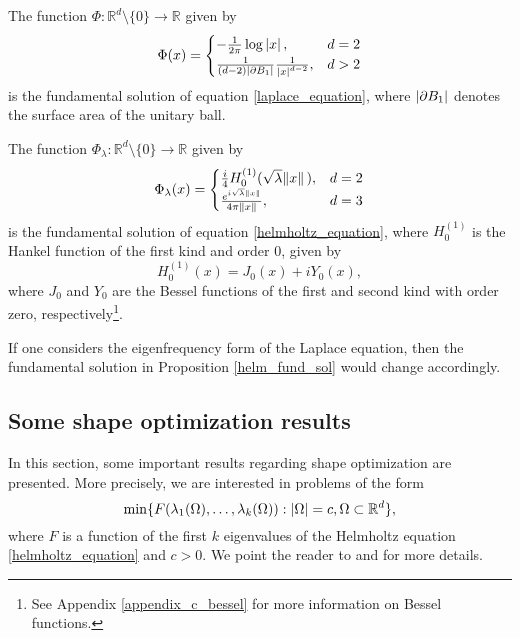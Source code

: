 \begin{proposition}
    The function \(\Phi: \mathbb{R}^d \setminus \{0\} \rightarrow \mathbb{R}\) given by
    \[
    \Phi(x) = \begin{cases}
        -\frac{1}{2 \pi} \log \abs*{x}, & d=2\\
        \frac{1}{(d-2)\abs{\partial B_1}}\frac{1}{\abs*{x}^{d-2}}, & d > 2
    \end{cases}    
    \]
    is the fundamental solution of equation \eqref{laplace_equation}, where \(\abs{\partial B_1}\) denotes the surface area of the unitary ball.
\end{proposition}
\begin{proposition}\label{helm_fund_sol}
    The function \(\Phi_\lambda: \mathbb{R}^d \setminus \{0\} \rightarrow \mathbb{R}\) given by
    \[
    \Phi_\lambda(x) = \begin{cases}
        \frac{i}{4} H_0^{(1)}(\sqrt{\lambda} \norm*{x}), & d=2\\
        \frac{e^{i \sqrt{\lambda} \norm*{x}}}{4 \pi \norm*{x}}, & d = 3
    \end{cases}    
    \]
    is the fundamental solution of equation \eqref{helmholtz_equation}, where \(H_0^{(1)}\) is the Hankel function of the first kind and order 0, given by
    \[
        H_0^{(1)}(x) = J_0(x) + i Y_0(x),
    \]
    where \(J_0\) and \(Y_0\) are the Bessel functions of the first and second kind with order zero, respectively\footnote{See Appendix \ref{appendix_c_bessel} for more information on Bessel functions.}.
\end{proposition}

If one considers the eigenfrequency form of the Laplace equation, then the fundamental solution in Proposition \ref{helm_fund_sol} would change accordingly.

\subsection{Some shape optimization results}

In this section, some important results regarding shape optimization are presented. More precisely, we are interested in problems of the form
\begin{equation}\label{shape_prob}
    \min\{F(\lambda_1(\Omega),\dots, \lambda_k(\Omega)): \abs{\Omega} = c, \Omega \subset \mathbb{R}^d\},
\end{equation}
where \(F\) is a function of the first \(k\) eigenvalues of the Helmholtz equation \eqref{helmholtz_equation} and \(c > 0\). We point the reader to \cite{henrot2006extremum} and \cite{henrot2017shape} for more details.

